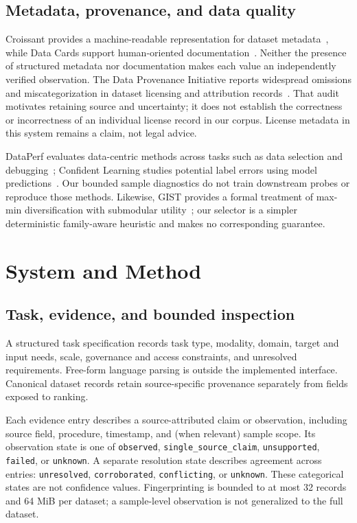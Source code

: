 \documentclass[conference]{IEEEtran}
\begin{document}
\subsection{Metadata, provenance, and data quality}
Croissant provides a machine-readable representation for dataset metadata~\cite{akhtar2024croissant}, while Data Cards support human-oriented documentation~\cite{pushkarna2022datacards}. Neither the presence of structured metadata nor documentation makes each value an independently verified observation. The Data Provenance Initiative reports widespread omissions and miscategorization in dataset licensing and attribution records~\cite{longpre2024dataprovenance}. That audit motivates retaining source and uncertainty; it does not establish the correctness or incorrectness of an individual license record in our corpus. License metadata in this system remains a claim, not legal advice.

DataPerf evaluates data-centric methods across tasks such as data selection and debugging~\cite{mazumder2023dataperf}; Confident Learning studies potential label errors using model predictions~\cite{northcutt2021confident}. Our bounded sample diagnostics do not train downstream probes or reproduce those methods. Likewise, GIST provides a formal treatment of max-min diversification with submodular utility~\cite{fahrbach2025gist}; our selector is a simpler deterministic family-aware heuristic and makes no corresponding guarantee.

\section{System and Method}
\subsection{Task, evidence, and bounded inspection}
A structured task specification records task type, modality, domain, target and input needs, scale, governance and access constraints, and unresolved requirements. Free-form language parsing is outside the implemented interface. Canonical dataset records retain source-specific provenance separately from fields exposed to ranking.

Each evidence entry describes a source-attributed claim or observation, including source field, procedure, timestamp, and (when relevant) sample scope. Its observation state is one of \texttt{observed}, \texttt{single\_source\_claim}, \texttt{unsupported}, \texttt{failed}, or \texttt{unknown}. A separate resolution state describes agreement across entries: \texttt{unresolved}, \texttt{corroborated}, \texttt{conflicting}, or \texttt{unknown}. These categorical states are not confidence values. Fingerprinting is bounded to at most 32 records and 64 MiB per dataset; a sample-level observation is not generalized to the full dataset.
\end{document}
